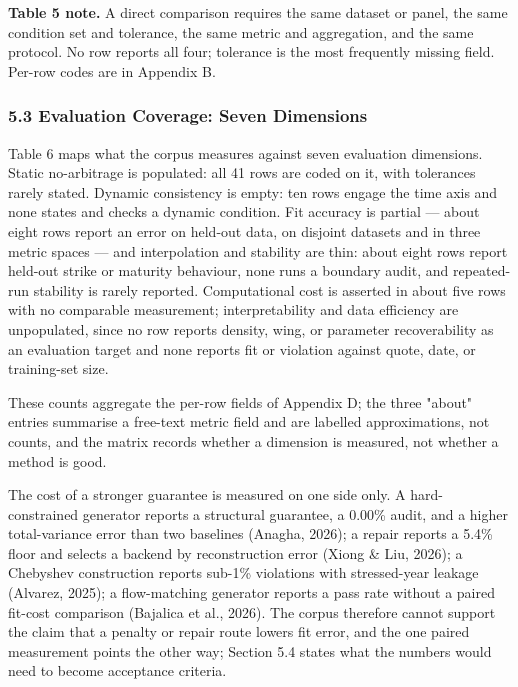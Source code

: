 \documentclass[11pt]{article}
\begin{document}
\textbf{Table 5 note.} A direct comparison requires the same dataset or panel, the same condition set and tolerance, the same metric and aggregation, and the same protocol. No row reports all four; tolerance is the most frequently missing field. Per-row codes are in Appendix B.

\subsubsection*{5.3 Evaluation Coverage: Seven Dimensions}
Table 6 maps what the corpus measures against seven evaluation dimensions. Static no-arbitrage is populated: all 41 rows are coded on it, with tolerances rarely stated. Dynamic consistency is empty: ten rows engage the time axis and none states and checks a dynamic condition. Fit accuracy is partial — about eight rows report an error on held-out data, on disjoint datasets and in three metric spaces — and interpolation and stability are thin: about eight rows report held-out strike or maturity behaviour, none runs a boundary audit, and repeated-run stability is rarely reported. Computational cost is asserted in about five rows with no comparable measurement; interpretability and data efficiency are unpopulated, since no row reports density, wing, or parameter recoverability as an evaluation target and none reports fit or violation against quote, date, or training-set size.

These counts aggregate the per-row fields of Appendix D; the three "about" entries summarise a free-text metric field and are labelled approximations, not counts, and the matrix records whether a dimension is measured, not whether a method is good.

The cost of a stronger guarantee is measured on one side only. A hard-constrained generator reports a structural guarantee, a 0.00\% audit, and a higher total-variance error than two baselines (Anagha, 2026); a repair reports a 5.4\% floor and selects a backend by reconstruction error (Xiong \& Liu, 2026); a Chebyshev construction reports sub-1\% violations with stressed-year leakage (Alvarez, 2025); a flow-matching generator reports a pass rate without a paired fit-cost comparison (Bajalica et al., 2026). The corpus therefore cannot support the claim that a penalty or repair route lowers fit error, and the one paired measurement points the other way; Section 5.4 states what the numbers would need to become acceptance criteria.
\end{document}
